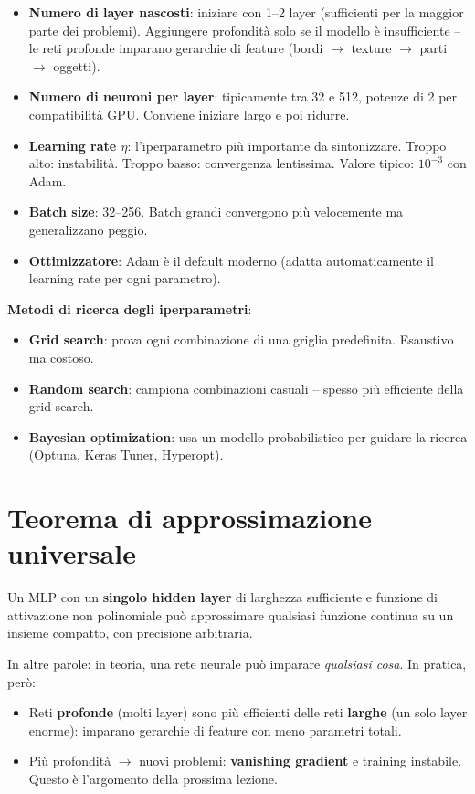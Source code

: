 \begin{itemize}
    \item \textbf{Numero di layer nascosti}: iniziare con 1--2 layer (sufficienti per la maggior parte dei problemi). Aggiungere profondità solo se il modello è insufficiente -- le reti profonde imparano gerarchie di feature (bordi $\to$ texture $\to$ parti $\to$ oggetti).
    \item \textbf{Numero di neuroni per layer}: tipicamente tra 32 e 512, potenze di 2 per compatibilità GPU. Conviene iniziare largo e poi ridurre.
    \item \textbf{Learning rate $\eta$}: l'iperparametro più importante da sintonizzare. Troppo alto: instabilità. Troppo basso: convergenza lentissima. Valore tipico: $10^{-3}$ con Adam.
    \item \textbf{Batch size}: 32--256. Batch grandi convergono più velocemente ma generalizzano peggio.
    \item \textbf{Ottimizzatore}: Adam è il default moderno (adatta automaticamente il learning rate per ogni parametro).
\end{itemize}

\textbf{Metodi di ricerca degli iperparametri}:
\begin{itemize}
    \item \textbf{Grid search}: prova ogni combinazione di una griglia predefinita. Esaustivo ma costoso.
    \item \textbf{Random search}: campiona combinazioni casuali -- spesso più efficiente della grid search.
    \item \textbf{Bayesian optimization}: usa un modello probabilistico per guidare la ricerca (Optuna, Keras Tuner, Hyperopt).
\end{itemize}

\section{Teorema di approssimazione universale}

\begin{thmbox}
Un MLP con un \textbf{singolo hidden layer} di larghezza sufficiente e funzione di attivazione non polinomiale può approssimare qualsiasi funzione continua su un insieme compatto, con precisione arbitraria.
\end{thmbox}

In altre parole: in teoria, una rete neurale può imparare \emph{qualsiasi cosa}. In pratica, però:

\begin{itemize}
    \item Reti \textbf{profonde} (molti layer) sono più efficienti delle reti \textbf{larghe} (un solo layer enorme): imparano gerarchie di feature con meno parametri totali.
    \item Più profondità $\to$ nuovi problemi: \textbf{vanishing gradient} e training instabile. Questo è l'argomento della prossima lezione.
\end{itemize}